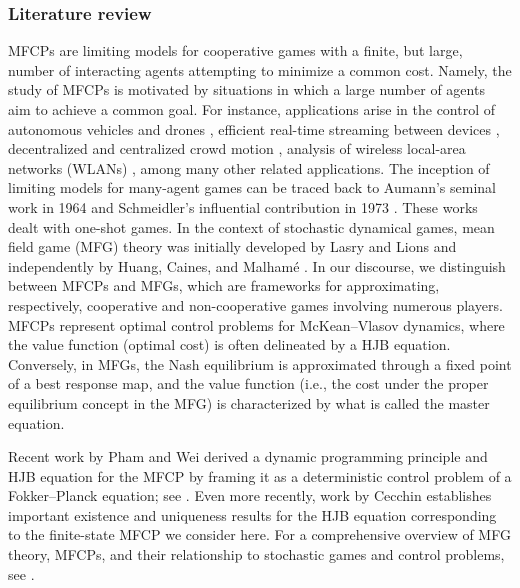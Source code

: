 \documentclass[11pt,reqno]{amsart}
\numberwithin{equation}{section}
\theoremstyle{plain}
\begin{document}
\subsubsection{Literature review}
MFCPs are limiting models for cooperative games with a finite, but large, number of interacting agents attempting to minimize a common cost. Namely, the study of MFCPs is motivated by situations in which a large number of agents aim to achieve a common goal. For instance, applications arise in the control of autonomous vehicles and drones \cite{drones7070476, mot-pha2022CONTROL}, efficient real-time streaming between devices \cite{7218597-2015}, decentralized and centralized crowd motion \cite{crowd-motion-1, crowd-motion-2}, analysis of wireless local-area networks (WLANs) \cite{duffy2010meanCONTROL, bor-sun2012CONTROL}, among many other related applications. The inception of limiting models for many-agent games can be traced back to Aumann's seminal work in 1964 \cite{aumann1964markets} and Schmeidler's influential contribution in 1973 \cite{schmeidler1973equilibrium}.  These works dealt with one-shot games. In the context of stochastic dynamical games, mean field game (MFG) theory was initially developed by Lasry and Lions \cite{lasry-lions-mfg} and independently by Huang, Caines, and Malhamé \cite{huang-caines-malhame-mfg}. In our discourse, we distinguish between MFCPs and MFGs, which are frameworks for approximating, respectively, cooperative and non-cooperative games involving numerous players. MFCPs represent optimal control problems for McKean--Vlasov dynamics, where the value function (optimal cost) is often delineated by a HJB equation. Conversely, in MFGs, the Nash equilibrium is approximated through a fixed point of a best response map, and the value function (i.e., the cost under the proper equilibrium concept in the MFG) is characterized by what is called the master equation. 

Recent work by Pham and Wei derived a dynamic programming principle and HJB equation for the MFCP by framing it as a deterministic control problem of a Fokker--Planck equation; see \cite{Pham2017, Pham2018}. Even more recently, work by Cecchin \cite{mfcp} establishes important existence and uniqueness results for the HJB equation corresponding to the finite-state MFCP we consider here. For a comprehensive overview of MFG theory, MFCPs, and their relationship to stochastic games and control problems, see \cite{Bensoussan2013, Carmona2018_I, Carmona2018_II}.  
\end{document}
